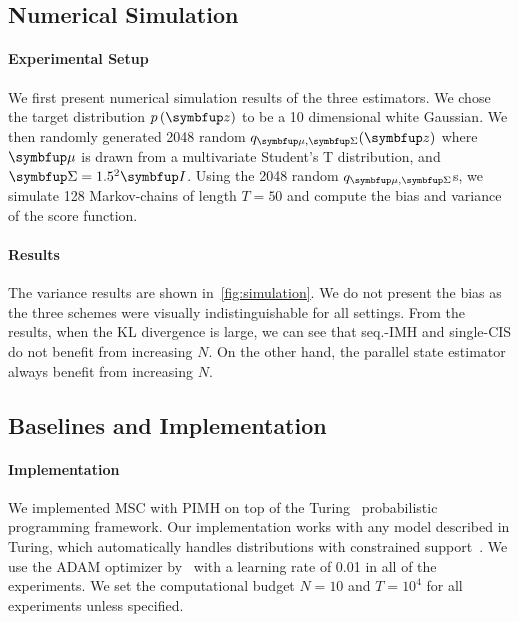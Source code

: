 \subsection{Numerical Simulation}\label{section:simulation}
\vspace{-0.05in}
\paragraph{Experimental Setup}
We first present numerical simulation results of the three estimators.
We chose the target distribution \(p\left(\vz\right)\) to be a 10 dimensional white Gaussian.
We then randomly generated 2048 random \(q_{\vmu, \mSigma}(\vz)\) where \(\vmu\) is drawn from a multivariate Student's T distribution, and \(\mSigma = 1.5^2 \mI\).
Using the 2048 random \(q_{\vmu, \mSigma}\)s, we simulate 128 Markov-chains of length \(T=50\) and compute the bias and variance of the score function.

\vspace{-0.05in}
\paragraph{Results}
The variance results are shown in~\cref{fig:simulation}.
We do not present the bias as the three schemes were visually indistinguishable for all settings.
From the results, when the KL divergence is large, we can see that seq.-IMH and single-CIS do not benefit from increasing \(N\).
On the other hand, the parallel state estimator always benefit from increasing \(N\).

\vspace{-0.05in}
\subsection{Baselines and Implementation}
\vspace{-0.05in}
\paragraph{Implementation}
We implemented MSC with PIMH on top of the Turing~\citep{ge2018t} probabilistic programming framework.
Our implementation works with any model described in Turing, which automatically handles distributions with constrained support~\citep{JMLR:v18:16-107}.
We use the ADAM optimizer by~\citet{kingma_adam_2015} with a learning rate of 0.01 in all of the experiments.
We set the computational budget \(N=10\) and \(T=10^4\) for all experiments unless specified.

